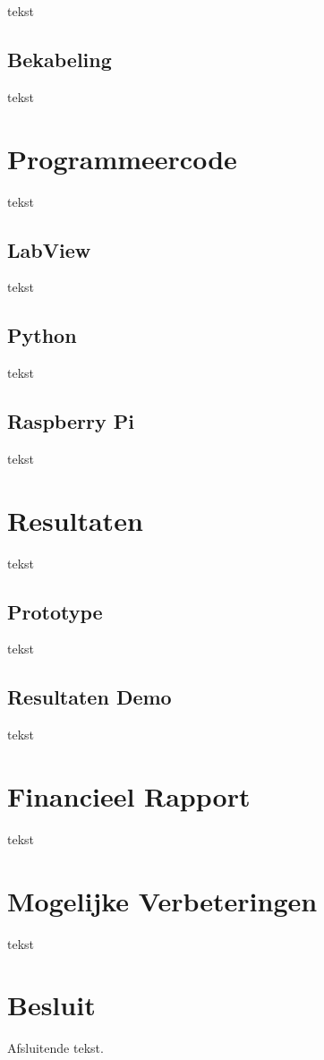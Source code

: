 \documentclass[kulak]{kulakarticle} %
\begin{document}
	tekst
	
	
	\subsection{Bekabeling}
	
	tekst
	
	
	
	\section{Programmeercode}
	
	tekst
	
	
	\subsection{LabView}
	
	tekst
	
	
	\subsection{Python}
	
	tekst
	
	
	\subsection{Raspberry Pi}
	
	tekst
	
	
	
	\section{Resultaten}
	
	tekst
	
	
	\subsection{Prototype}
	
	tekst
	
	
	\subsection{Resultaten Demo}
	
	tekst
	
	
	
	\section{Financieel Rapport}
	
	tekst
	
	
	
	\section{Mogelijke Verbeteringen}
	
	tekst
	
	
	
	\section*{Besluit}
	
	Afsluitende tekst.
	
	
	
	
	
	
	
	
\end{document}
